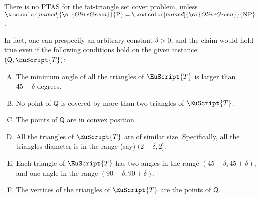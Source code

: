 \documentclass[12pt]{article}
\newcommand{\PntSet}{{\mathsf{Q}}}
\newcommand{\TriSet}{\EuScript{T}}
\providecommand{\ComplexityClass}[1]{{{\textcolor[named]{\si{OliveGreen}}{\textsc{#1}}}}}
\providecommand{\NP}{\ComplexityClass{NP}\xspace}
\providecommand{\POLYT}{\ComplexityClass{P}\xspace}
\providecommand{\PTAS}{\textsf{\si{PTAS}}\xspace}
\begin{document}
\begin{lemma}
    There is no \PTAS for the fat-triangle set cover problem, unless
    $\POLYT=\NP$. 

    In fact, one can prespecify an arbitrary constant $\delta > 0$, and
    the claim would hold true even if the following conditions hold on
    the given instance $(\PntSet,\TriSet)$:
    \begin{center}
    \begin{minipage}{0.9\linewidth}
    \begin{enumerate}[(A)]
        \item The minimum angle of all the triangles of $\TriSet$ is
        larger than $45-\delta$ degrees.

        \item No point of $\PntSet$ is covered by more than two
        triangles of $\TriSet$.

        \item The points of $\PntSet$ are in convex position.

        \item All the triangles of $\TriSet$ are of similar
        size. Specifically, all the triangles diameter is in the range
        (say) $(2-\delta, 2]$.

        \item Each triangle of $\TriSet$ has two angles in
        the range $(45-\delta, 45+\delta)$, and one angle in the
        range $(90-\delta, 90+\delta)$.

        \item The vertices of the triangles of $\TriSet$ are the
        points of $\PntSet$.
    \end{enumerate}
    \end{minipage}
    \end{center}

\end{lemma}
\end{document}
